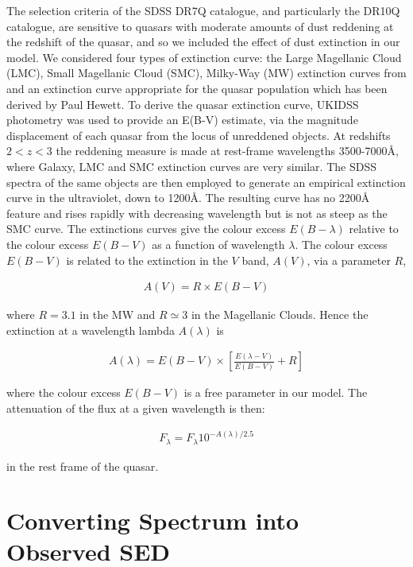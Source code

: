 The selection criteria of the SDSS DR7Q catalogue, and particularly the DR10Q catalogue, are sensitive to quasars with moderate amounts of dust reddening \citep[possibly as high as E(B-V) $\sim$ 0.5;][]{richards03} at the redshift of the quasar, and so we included the effect of dust extinction in our model. We considered four types of extinction curve: the Large Magellanic Cloud (LMC), Small Magellanic Cloud (SMC), Milky-Way (MW) extinction curves from \citet{pei92} and an extinction curve appropriate for the quasar population which has been derived by Paul Hewett. To derive the quasar extinction curve, UKIDSS photometry was used to provide an E(B-V) estimate, via the magnitude displacement of each quasar from the locus of unreddened objects. At redshifts $2 < z < 3$ the reddening measure is made at rest-frame wavelengths 3500-7000\AA, where Galaxy, LMC and SMC extinction curves are very similar. The SDSS spectra of the same objects are then employed to generate an empirical extinction curve in the ultraviolet, down to 1200\AA. The resulting curve has no 2200\AA~ feature and rises rapidly with decreasing wavelength but is not as steep as the SMC curve. The extinctions curves give the colour excess $E(B-\lambda)$ relative to the colour excess $E(B-V)$ as a function of wavelength $\lambda$. The colour excess $E(B-V)$ is related to the extinction in the $V$ band, $A(V)$, via a parameter $R$, 

\begin{eqnarray}
  A(V) = R \times E(B -V )
\end{eqnarray}

where $R = 3.1$ in the MW and $R \simeq 3$ in the Magellanic Clouds. Hence the extinction at a wavelength lambda $A(\lambda)$ is 

\begin{eqnarray}
  A(\lambda) = E(B-V) \times \left[ \frac{E(\lambda-V)}{E(B-V)} + R \right] 
\end{eqnarray}

where the colour excess $E(B-V)$ is a free parameter in our model. The attenuation of the flux at a given wavelength is then:

\begin{eqnarray}
  F_\lambda = F_\lambda10^{-A(\lambda)/2.5}
\end{eqnarray}

in the rest frame of the quasar. 

\section{Converting Spectrum into Observed SED}
\label{sec:sedconversion}

